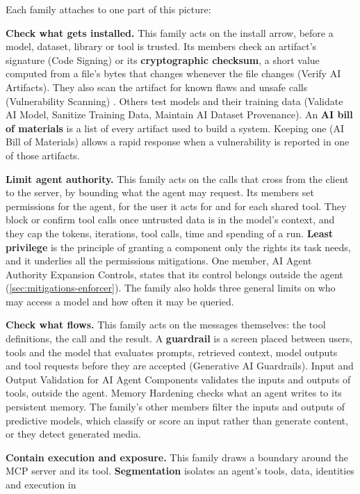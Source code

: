 Each family attaches to one part of this picture:
\bi
\item \textbf{Check what gets installed.} This family acts on the install arrow, before a model,
dataset, library or tool is trusted. Its members check an artifact's signature (Code Signing) or
its \textbf{cryptographic checksum}, a short value computed from a file's bytes that changes
whenever the file changes (Verify AI Artifacts). They also scan the artifact for known flaws and
unsafe calls (Vulnerability Scanning) \citep{mitre-atlas-2026}. Others test models and their
training data (Validate AI Model, Sanitize Training Data, Maintain AI Dataset Provenance). An
\textbf{AI bill of materials} is a list of every artifact used to build a system. Keeping one (AI
Bill of Materials) allows a rapid response when a vulnerability is reported in one of those
artifacts.
\item \textbf{Limit agent authority.} This family acts on the calls that cross from the client to
the server, by bounding what the agent may request. Its members set permissions for the agent, for
the user it acts for and for each shared tool. They block or confirm tool calls once untrusted data
is in the model's context, and they cap the tokens, iterations, tool calls, time and spending of a
run. \textbf{Least privilege} is the principle of granting a component only the rights its task
needs, and it underlies all the permissions mitigations. One member, AI Agent Authority Expansion
Controls, states that its control belongs outside the agent (\cref{sec:mitigations-enforcer}). The
family also holds three general limits on who may access a model and how often it may be queried.
\item \textbf{Check what flows.} This family acts on the messages themselves: the tool definitions,
the call and the result. A \textbf{guardrail} is a screen placed between users, tools and the model
that evaluates prompts, retrieved context, model outputs and tool requests before they are accepted
(Generative AI Guardrails). Input and Output Validation for AI Agent Components validates the
inputs and outputs of tools, outside the agent. Memory Hardening checks what an agent writes to its
persistent memory. The family's other members filter the inputs and outputs of predictive models,
which classify or score an input rather than generate content, or they detect generated media.
\item \textbf{Contain execution and exposure.} This family draws a boundary around the MCP server
and its tool. \textbf{Segmentation} isolates an agent's tools, data, identities and execution in
